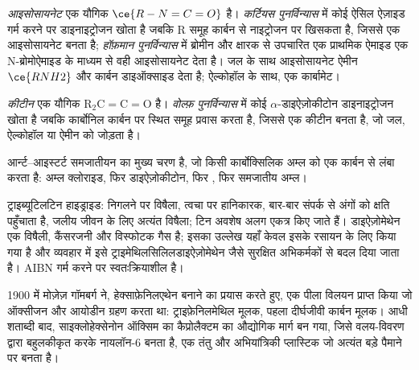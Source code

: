 \begin{definition}[आइसोसायनेट, कर्टियस और हॉफ़मान पुनर्विन्यास]\label{def:b3:radicals-carbenes:curtius}
\emph{आइसोसायनेट} एक यौगिक $\ce{R-N=C=O}$ है। \emph{कर्टियस पुनर्विन्यास}
 में कोई ऐसिल ऐज़ाइड गर्म करने पर डाइनाइट्रोजन खोता है
जबकि R समूह कार्बन से नाइट्रोजन पर खिसकता है, जिससे एक आइसोसायनेट बनता है;
\emph{हॉफ़मान पुनर्विन्यास} में ब्रोमीन और क्षारक से
उपचारित एक प्राथमिक ऐमाइड एक
N-ब्रोमोऐमाइड के माध्यम से वही आइसोसायनेट देता है। जल के साथ आइसोसायनेट ऐमीन $\ce{RNH2}$ और कार्बन
डाइऑक्साइड देता है; ऐल्कोहॉल के साथ, एक कार्बामेट।
\end{definition}

\begin{definition}[कीटीन और वोल्फ़ पुनर्विन्यास]\label{def:b3:radicals-carbenes:wolff}
\emph{कीटीन} एक यौगिक $\mathrm{R_2C{=}C{=}O}$ है। \emph{वोल्फ़ पुनर्विन्यास}
 में कोई $\alpha$-डाइऐज़ोकीटोन डाइनाइट्रोजन खोता है
जबकि कार्बोनिल कार्बन पर स्थित समूह प्रवास करता है, जिससे एक कीटीन बनता है, जो
जल, ऐल्कोहॉल या ऐमीन को जोड़ता है।
\end{definition}

 आर्न्ट--आइस्टर्ट समजातीयन का मुख्य चरण है,
जो किसी कार्बोक्सिलिक अम्ल को एक कार्बन से लंबा करता है: अम्ल क्लोराइड, फिर
डाइऐज़ोकीटोन, फिर , फिर समजातीय अम्ल।

\begin{safety}{}
ट्राइब्यूटिलटिन हाइड्राइड: निगलने पर विषैला, त्वचा पर हानिकारक, बार-बार संपर्क से अंगों को
क्षति पहुँचाता है, जलीय जीवन के लिए अत्यंत विषैला; टिन अवशेष अलग
एकत्र किए जाते हैं। डाइऐज़ोमेथेन एक विषैली, कैंसरजनी और विस्फोटक गैस है; इसका
उल्लेख यहाँ केवल इसके रसायन के लिए किया गया है और व्यवहार में इसे
ट्राइमेथिलसिलिलडाइऐज़ोमेथेन जैसे सुरक्षित अभिकर्मकों से बदल दिया जाता है। AIBN गर्म करने पर स्वतःक्रियाशील है।
\end{safety}

\begin{history}[एक मूलक जिसे नहीं होना चाहिए था, और एक नायलॉन]
1900 में मोज़ेज़ गॉमबर्ग ने, हेक्साफ़ेनिलएथेन बनाने का प्रयास करते हुए, एक पीला
विलयन प्राप्त किया जो ऑक्सीजन और आयोडीन ग्रहण करता था: ट्राइफ़ेनिलमेथिल मूलक, पहला
दीर्घजीवी कार्बन मूलक। आधी शताब्दी बाद, साइक्लोहेक्सेनोन ऑक्सिम का 
कैप्रोलैक्टम का औद्योगिक मार्ग बन गया, जिसे वलय-विवरण द्वारा
बहुलकीकृत करके नायलॉन-6 बनता है, एक तंतु और अभियांत्रिकी प्लास्टिक जो अत्यंत बड़े
पैमाने पर बनता है।
\end{history}

